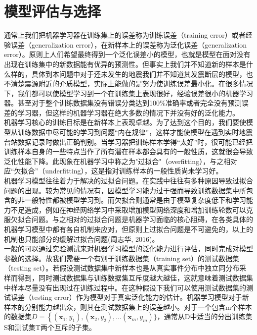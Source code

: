 \section{模型评估与选择}
 \indent 通常上我们把机器学习器在训练集上的误差称为训练误差（training error）或者经验误差（generalization error），在新样本上的误差称为泛化误差（generalization error）。原则上人们希望最终得到一个泛化误差小的模型，也就是模型在面对没有出现在训练集中的新数据能有优异的预测性。但事实上我们并不知道新的样本是什么样的，具体到本问题中对于还未发生的地震我们并不知道其发震断层的模型，也不清楚震源附近的介质模型，实际上能做的是努力使训练误差最小化。在很多情况下，我们都可以使模型学习到一个在训练集上表现很好，经验误差很小的机器学习器。甚至对于整个训练数据集没有错误分类达到100\%准确率或者完全没有预测误差的学习器，但这样的机器学习器在绝大多数的情况下并没有好的泛化能力。\\
 \indent 机器学习核心的训练目标是在新样本上表现卓越。为了达到这个目的，我们要使模型从训练数据中尽可能的学习到问题“内在规律”，这样才能使模型在遇到实时地震台站数据记录时做出正确判别。当学习器把训练样本学得“太好”时，很可能已经把训练样本自身的一些特点当作了所有潜在样本都会具有的一般性质，这就很会导致泛化性能下降。此现象在机器学习中称之为"过拟合"（overfitting），与之相对应“欠拟合”（underfitting），这是指对训练样本的一般性质尚未学习好。\\
 \indent 机器学习模型往往着力于解决的过拟合问题。在实践中往往有多种原因导致过拟合问题的出现。较为常见的情况有，因模型学习能力过于强而导致训练数据集中所包含的非一般特性都被模型学习到。而欠拟合则通常是由于模型复杂度低下和学习能力不足造成，例如在神经网络学习中采取增加模型网络深度和增加训练轮数可以克服欠拟合问题。与之相对的过拟合问题是机器学习面临的核心阻碍，在各类具体的机器学习模型中都有各自机制来应对，但原则上过拟合问题是不可避免的，以上的机制也只能部分的缓解过拟合问题(周志华, 2016)。\\
 \indent 一般的可以通过实验测试来对机器学习模型的泛化能力进行评估，同时完成对模型参数的选择。故我们需要一个有别于训练数据集（training set）的测试数据集（testing set）。若假设测试数据集中新样本也是从真实事件分布中独立同分布采样而得到，同时测试数据集与训练数据集互斥度越大越佳，这就意味着测试数据集中样本尽量没有出现过在训练过程中。在这种假设下我们可以使用测试数据集的测试误差（testing error）作为模型对于真实泛化能力的估计。机器学习模型对于新样本的分别能力越出众，则其在测试数据集上的误差越小。对于一个包含m个样本的数据集$D=\left\{\left(\boldsymbol{x}_{1}, y_{1}\right),\left(\boldsymbol{x}_{2}, y_{2}\right), \ldots\right.\left(\boldsymbol{x}_{m}, y_{m}\right) \}$，通常从D中适当的分出训练集S和测试集T两个互斥的子集。\\
